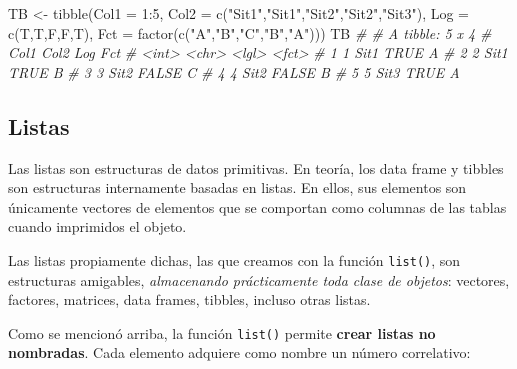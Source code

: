 \documentclass[
]{article}
\newenvironment{Shaded}{\begin{snugshade}}{\end{snugshade}}
\newcommand{\AttributeTok}[1]{\textcolor[rgb]{0.77,0.63,0.00}{#1}}
\newcommand{\CommentTok}[1]{\textcolor[rgb]{0.56,0.35,0.01}{\textit{#1}}}
\newcommand{\DecValTok}[1]{\textcolor[rgb]{0.00,0.00,0.81}{#1}}
\newcommand{\FunctionTok}[1]{\textcolor[rgb]{0.00,0.00,0.00}{#1}}
\newcommand{\NormalTok}[1]{#1}
\newcommand{\OtherTok}[1]{\textcolor[rgb]{0.56,0.35,0.01}{#1}}
\newcommand{\SpecialCharTok}[1]{\textcolor[rgb]{0.00,0.00,0.00}{#1}}
\newcommand{\StringTok}[1]{\textcolor[rgb]{0.31,0.60,0.02}{#1}}
\theoremstyle{definition}
\theoremstyle{definition}
\theoremstyle{definition}
\theoremstyle{definition}
\theoremstyle{remark}
\begin{document}
\begin{Shaded}
\begin{Highlighting}[]
\NormalTok{TB }\OtherTok{\textless{}{-}} \FunctionTok{tibble}\NormalTok{(}\AttributeTok{Col1 =} \DecValTok{1}\SpecialCharTok{:}\DecValTok{5}\NormalTok{, }
                 \AttributeTok{Col2 =} \FunctionTok{c}\NormalTok{(}\StringTok{"Sit1"}\NormalTok{,}\StringTok{"Sit1"}\NormalTok{,}\StringTok{"Sit2"}\NormalTok{,}\StringTok{"Sit2"}\NormalTok{,}\StringTok{"Sit3"}\NormalTok{),}
                 \AttributeTok{Log =} \FunctionTok{c}\NormalTok{(T,T,F,F,T),}
                 \AttributeTok{Fct =} \FunctionTok{factor}\NormalTok{(}\FunctionTok{c}\NormalTok{(}\StringTok{"A"}\NormalTok{,}\StringTok{"B"}\NormalTok{,}\StringTok{"C"}\NormalTok{,}\StringTok{"B"}\NormalTok{,}\StringTok{"A"}\NormalTok{)))}
\NormalTok{TB}
\CommentTok{\# \# A tibble: 5 x 4}
\CommentTok{\#    Col1 Col2  Log   Fct  }
\CommentTok{\#   \textless{}int\textgreater{} \textless{}chr\textgreater{} \textless{}lgl\textgreater{} \textless{}fct\textgreater{}}
\CommentTok{\# 1     1 Sit1  TRUE  A    }
\CommentTok{\# 2     2 Sit1  TRUE  B    }
\CommentTok{\# 3     3 Sit2  FALSE C    }
\CommentTok{\# 4     4 Sit2  FALSE B    }
\CommentTok{\# 5     5 Sit3  TRUE  A}
\end{Highlighting}
\end{Shaded}

\hypertarget{listas}{%
\subsection{Listas}\label{listas}}

Las listas son estructuras de datos primitivas. En teoría, los data frame y tibbles son estructuras internamente basadas en listas. En ellos, sus elementos son únicamente vectores de elementos que se comportan como columnas de las tablas cuando imprimidos el objeto.

Las listas propiamente dichas, las que creamos con la función \texttt{list()}, son estructuras amigables, \emph{almacenando prácticamente toda clase de objetos}: vectores, factores, matrices, data frames, tibbles, incluso otras listas.

Como se mencionó arriba, la función \texttt{list()} permite \textbf{crear listas no nombradas}. Cada elemento adquiere como nombre un número correlativo:
\end{document}
